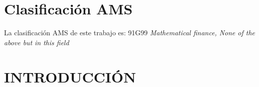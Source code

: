 \documentclass[]{DissertateUSU}
\begin{document}
\newpage
{}
\fancyhead[R]{\thepage}
\fancyfoot[C]{}
\chapter*{\textbf{Clasificación AMS}}

La clasificación AMS de este trabajo es: 91G99 \emph{Mathematical
finance, None of the above but in this field} \newpage
{} \fancyhead[R]{} \fancyfoot[C]{} \tableofcontents

\newpage
{}
\fancyhead[R]{\thepage}
\fancyfoot[C]{}
\listoftables

\newpage
{}
\fancyhead[R]{\thepage}
\fancyfoot[C]{}
\listoffigures

\newpage
{}

\newpage
{}
\fancyhead[R]{\thepage}
\fancyfoot[C]{}

\chapter{\textbf{INTRODUCCIÓN}}

\justifying
\setlength\parskip{5ex}
\end{document}
